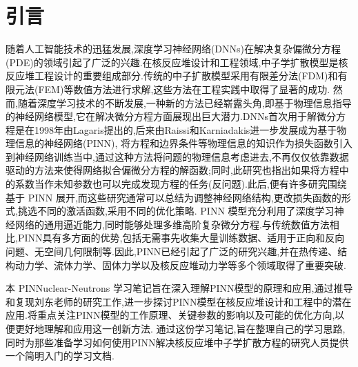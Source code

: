 \documentclass{Sichuan Normal University}
\begin{document}


\maketitle
\newpage
\tableofcontents  %
\clearpage %

\listoffigures %
\listoftables %

\newpage
\section*{引言}
随着人工智能技术的迅猛发展,深度学习神经网络(DNNs)在解决复杂偏微分方程(PDE)的领域引起了广泛的兴趣.在核反应堆设计和工程领域,中子学扩散模型是核反应堆工程设计的重要组成部分.传统的中子扩散模型采用有限差分法(FDM)和有限元法(FEM)等数值方法进行求解,这些方法在工程实践中取得了显著的成功.
然而,随着深度学习技术的不断发展,一种新的方法已经崭露头角,即基于物理信息指导的神经网络模型,它在解决微分方程方面展现出巨大潜力.DNNs首次用于解微分方程是在1998年由Lagaris提出的\cite{lagarisArtificialNeuralNetworks1998},后来由Raissi和Karniadakis进一步发展成为基于物理信息的神经网络(PINN)\cite{raissiPhysicsinformedNeuralNetworks2019},
将方程和边界条件等物理信息的知识作为损失函数引入到神经网络训练当中,通过这种方法将问题的物理信息考虑进去,不再仅仅依靠数据驱动的方法来使得网络拟合偏微分方程的解函数;同时,此研究也指出如果将方程中的系数当作未知参数也可以完成发现方程的任务(反问题).此后,便有许多研究围绕基于 PINN 展开,而这些研究通常可以总结为调整神经网络结构,更改损失函数的形式,挑选不同的激活函数,采用不同的优化策略.
 PINN 模型充分利用了深度学习神经网络的通用逼近能力,同时能够处理多维高阶复杂微分方程.与传统数值方法相比,PINN具有多方面的优势,包括无需事先收集大量训练数据、适用于正向和反向问题、无空间几何限制等.因此,PINN已经引起了广泛的研究兴趣,并在热传递、结构动力学、流体力学、固体力学以及核反应堆动力学等多个领域取得了重要突破.

本 PINNuclear-Neutrons 学习笔记旨在深入理解PINN模型的原理和应用,通过推导和复现刘东老师的研究工作\cite{LiuDongJiYuPINNShenDuJiQiXueXiJiShuQiuJieDuoWeiZhongZiXueKuoSanFangCheng2022},进一步探讨PINN模型在核反应堆设计和工程中的潜在应用.将重点关注PINN模型的工作原理、关键参数的影响以及可能的优化方向,以便更好地理解和应用这一创新方法.
通过这份学习笔记,旨在整理自己的学习思路,同时为那些准备学习如何使用PINN解决核反应堆中子学扩散方程的研究人员提供一个简明入门的学习文档.
\end{document}
